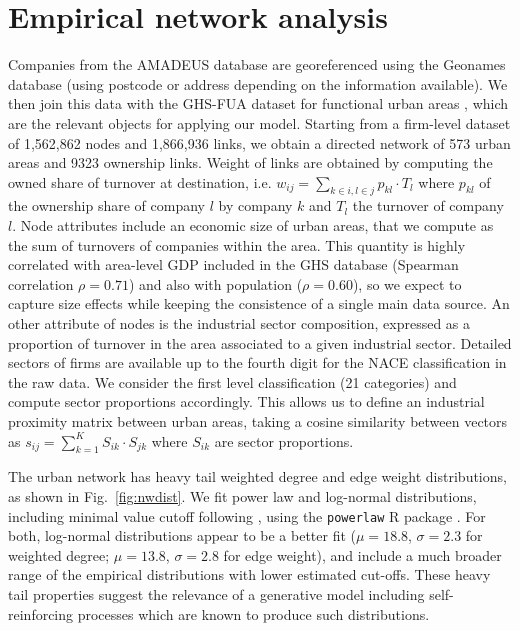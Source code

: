 \documentclass[11pt]{article}
\begin{document}
\section{Empirical network analysis}


Companies from the AMADEUS database are georeferenced using the Geonames database (using postcode or address depending on the information available). We then join this data with the GHS-FUA dataset for functional urban areas \cite{Florczyk2019ghs}, which are the relevant objects for applying our model. Starting from a firm-level dataset of 1,562,862 nodes and  1,866,936 links, we obtain a directed network of 573 urban areas and 9323 ownership links. Weight of links are obtained by computing the owned share of turnover at destination, i.e. $w_{ij} = \sum_{k \in i,l \in j} p_{kl} \cdot T_l$ where $p_{kl}$ of the ownership share of company $l$ by company $k$ and $T_l$ the turnover of company $l$. Node attributes include an economic size of urban areas, that we compute as the sum of turnovers of companies within the area. This quantity is highly correlated with area-level GDP included in the GHS database (Spearman correlation $\rho = 0.71$) and also with population ($\rho = 0.60$), so we expect to capture size effects while keeping the consistence of a single main data source. An other attribute of nodes is the industrial sector composition, expressed as a proportion of turnover in the area associated to a given industrial sector. Detailed sectors of firms are available up to the fourth digit for the NACE classification in the raw data. We consider the first level classification (21 categories) and compute sector proportions accordingly. This allows us to define an industrial proximity matrix between urban areas, taking a cosine similarity between vectors as $s_{ij} = \sum_{k=1}^{K} S_{ik}\cdot S_{jk}$ where $S_{ik}$ are sector proportions.


The urban network has heavy tail weighted degree and edge weight distributions, as shown in Fig.~\ref{fig:nwdist}. We fit power law and log-normal distributions, including minimal value cutoff following \cite{clauset2009power}, using the \texttt{powerlaw} R package \cite{powerlawpackage}. For both, log-normal distributions appear to be a better fit ($\mu=18.8$, $\sigma=2.3$ for weighted degree; $\mu=13.8$, $\sigma=2.8$ for edge weight), and include a much broader range of the empirical distributions with lower estimated cut-offs. These heavy tail properties suggest the relevance of a generative model including self-reinforcing processes which are known to produce such distributions.
\end{document}
